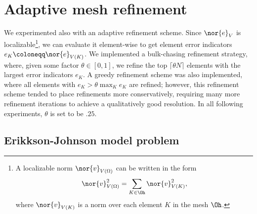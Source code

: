 \section{Adaptive mesh refinement}

We experimented also with an adaptive refinement scheme.  Since $\nor{e}_V$ is localizable\footnote{A localizable norm $\nor{v}_{V(\Omega)}$ can be written in the form 
$$\nor{v}_{V(\Omega)}^2 = \sum_{K\in \Oh} \nor{v}_{V(K)}^2,$$ where $\nor{v}_{V(K)}$ is a norm over each element $K$ in the mesh $\Oh$.}, we can evaluate it element-wise to get element error indicators $e_K \coloneqq \nor{e}_{V(K)}$.  We implemented a bulk-chasing refinement strategy, where, given some factor $\theta \in [0,1]$, we refine the top $\lceil{\theta N}\rceil$ elements with the largest error indicators $e_K$.  A greedy refinement scheme was also implemented, where all elements with $e_K > \theta \max_K e_K$ are refined; however, this refinement scheme tended to place refinements more conservatively, requiring many more refinement iterations to achieve a qualitatively good resolution.  In all following experiments, $\theta$ is set to be $.25$.  

\subsection{Erikkson-Johnson model problem}

